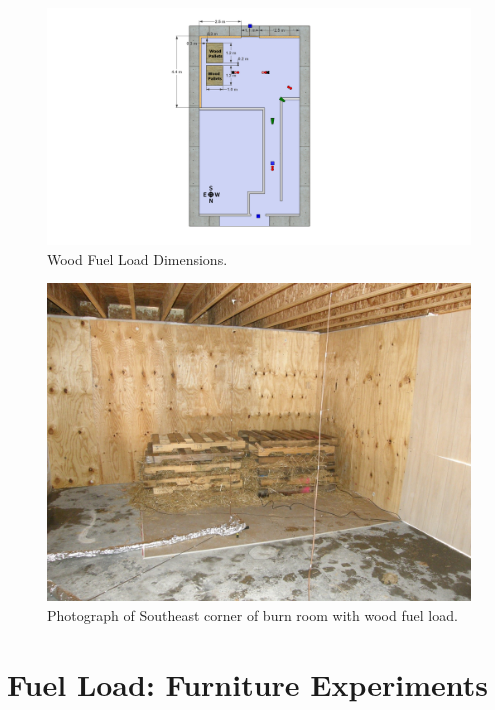 \documentclass[12pt,oneside]{book}
\begin{document}
\begin{figure}[!ht]
	\includegraphics[width=6in]{../Figures/Pictures/DelCoSingleStoryWoodFuelLoad}
	\caption{Wood Fuel Load Dimensions.}
	\label{fig:Wood_Fuel_Load_Dimensions}
\end{figure}

\begin{figure}[!ht]
	\includegraphics[width=6in]{../Figures/Pictures/Wood_Fuel_Package}
	\caption{Photograph of Southeast corner of burn room with wood fuel load.}
	\label{fig:Wood_Fuel_Load}
\end{figure}

\section{Fuel Load: Furniture Experiments}
\label{sec:Fuel_Load:_Furniture_Experiments}
\end{document}
